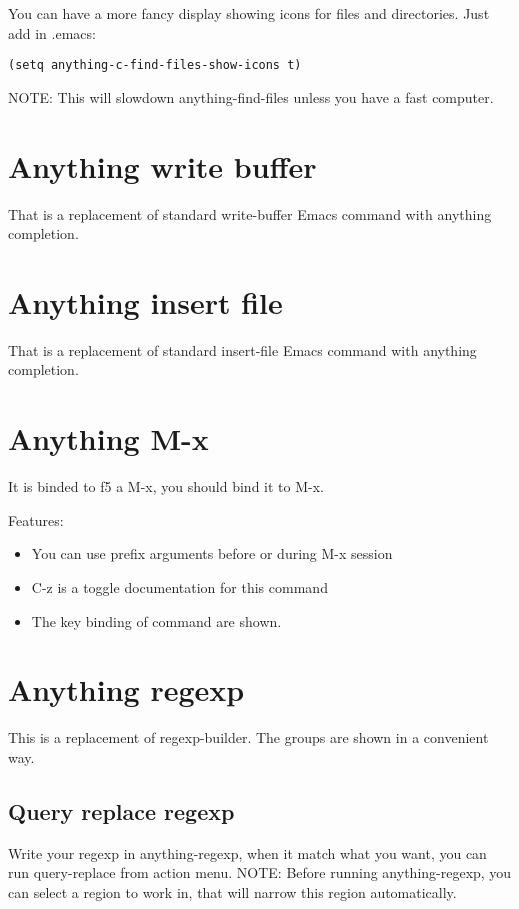 \documentclass[a4paper,11pt]{article}
\begin{document}
You can have a more fancy display showing icons for files and directories.
Just add in .emacs:
\begin{verbatim}
(setq anything-c-find-files-show-icons t)
\end{verbatim}
NOTE: This will slowdown anything-find-files unless you have a fast computer.

\section{Anything write buffer}
\label{sec:anyth-write-buff}
That is a replacement of standard write-buffer Emacs command with anything completion.
\section{Anything insert file}
\label{sec:anything-insert-file}
That is a replacement of standard insert-file Emacs command with anything completion.

\section{Anything M-x}
\label{sec:anything-m-x}
It is binded to f5 a M-x, you should bind it to M-x.

Features:\\
\begin{itemize}
\item You can use prefix arguments before or during M-x session
\end{itemize}
\begin{itemize}
\item C-z is a toggle documentation for this command
\end{itemize}
\begin{itemize}
\item The key binding of command are shown.
\end{itemize}

\section{Anything regexp}
\label{sec:anything-regexp}
This is a replacement of regexp-builder.
The groups are shown in a convenient way.

\subsection{Query replace regexp}
\label{sec:query-replace-regexp}
Write your regexp in anything-regexp, when it match what you want,
you can run query-replace from action menu.
NOTE:
Before running anything-regexp, you can select a region to work in, that will narrow this region
automatically. 
\end{document}

